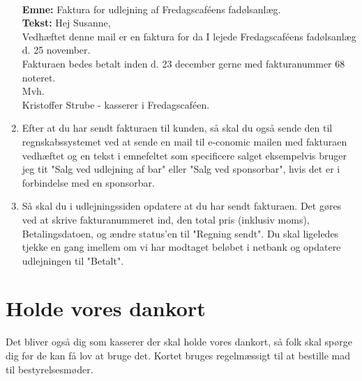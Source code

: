\begin{enumerate}
    \\
    \textbf{Emne: } Faktura for udlejning af Fredagscaféens fadølsanlæg.\\
    \textbf{Tekst: } Hej Susanne,\\
    Vedhæftet denne mail er en faktura for da I lejede Fredagscaféens fadølsanlæg d. 25 november.\\
    Fakturaen bedes betalt inden d. 23 december gerne med fakturanummer 68 noteret.\\
    Mvh.\\
    Kristoffer Strube - kasserer i Fredagscaféen.
    \item Efter at du har sendt fakturaen til kunden, så skal du også sende den til regnskabssystemet ved at sende en mail til e-conomic mailen med fakturaen vedhæftet og en tekst i emnefeltet som specificere salget eksempelvis bruger jeg tit "Salg ved udlejning af bar" eller "Salg ved sponsorbar", hvis det er i forbindelse med en sponsorbar.
    \item Så skal du i udlejningssiden opdatere at du har sendt fakturaen. Det gøres ved at skrive fakturanummeret ind, den total pris (inklusiv moms), Betalingsdatoen, og ændre status'en til "Regning sendt". Du skal ligeledes tjekke en gang imellem om vi har modtaget beløbet i netbank og opdatere udlejningen til "Betalt".
\end{enumerate}

\section{Holde vores dankort}
Det bliver også dig som kasserer der skal holde vores dankort, så folk skal spørge dig før de kan få lov at bruge det. Kortet bruges regelmæssigt til at bestille mad til bestyrelsesmøder.

